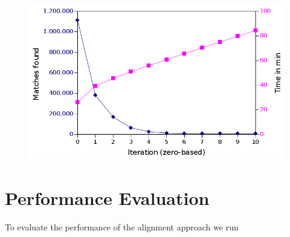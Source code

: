 
	\begin{figure}[h!]
		\includegraphics[width=\textwidth]{chapters/casestudy/hasehase.png}
		\caption{}
		\label{fig:hasehase}
	\end{figure}


\section{Performance Evaluation}
To evaluate the performance of the alignment approach we run

